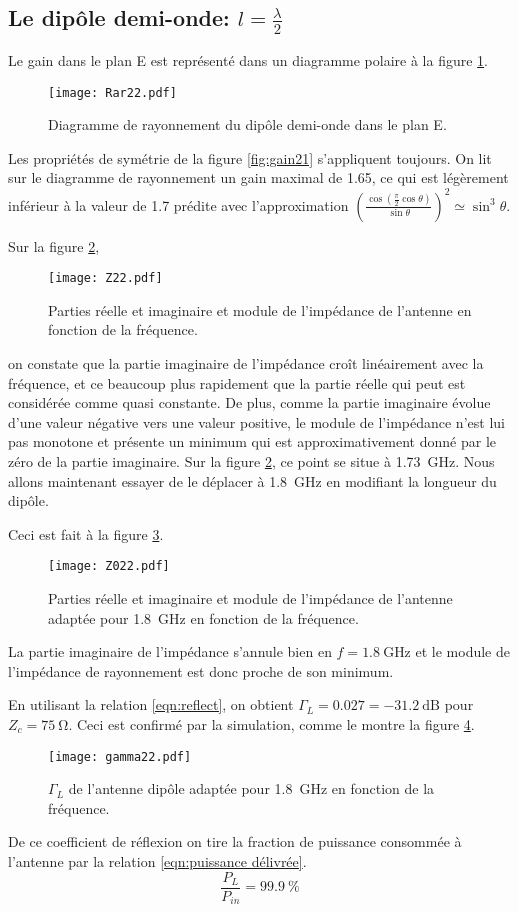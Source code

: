 \subsection{Le dipôle demi-onde: $l = \frac{\lambda}{2}$}
\label{subsec:demionde}
Le gain dans le plan E est représenté dans un diagramme polaire à la figure \ref{fig:gain22}.
\begin{figure}[htbp]
  \centering
  \texttt{[image: Rar22.pdf]}
  \caption{Diagramme de rayonnement du dipôle demi-onde dans le plan E.\label{fig:gain22}}
\end{figure}
Les propriétés de symétrie de la figure \ref{fig:gain21} s'appliquent toujours. On lit sur le diagramme de rayonnement un gain maximal de \num{1.65}, ce qui est légèrement inférieur à la valeur de \num{1.7} prédite avec l'approximation $\left ( \frac{\cos(\frac{\pi}{2}\cos\theta)}{\sin\theta} \right ) ^2 \simeq \sin^3 \theta$.

Sur la figure \ref{fig:Z22},
\begin{figure}[htbp]
  \centering
  \texttt{[image: Z22.pdf]}
  \caption{Parties réelle et imaginaire et module de l'impédance de l'antenne en fonction de la fréquence.\label{fig:Z22}}
\end{figure}
on constate que la partie imaginaire de l'impédance croît linéairement avec la fréquence, et ce beaucoup plus rapidement que la partie réelle qui peut est considérée comme quasi constante. De plus, comme la partie imaginaire évolue d'une valeur négative vers une valeur positive, le module de l'impédance n'est lui pas monotone et présente un minimum qui est approximativement donné par le zéro de la partie imaginaire. Sur la figure \ref{fig:Z22}, ce point se situe à \SI{1.73}{\giga\hertz}. Nous allons maintenant essayer de le déplacer à \SI{1.8}{\giga\hertz} en modifiant la longueur du dipôle.

Ceci est fait à la figure \ref{fig:Z022}.
\begin{figure}[htbp]
  \centering
  \texttt{[image: Z022.pdf]}
  \caption{Parties réelle et imaginaire et module de l'impédance de l'antenne adaptée pour \SI{1.8}{\giga\hertz} en fonction de la fréquence.\label{fig:Z022}}
\end{figure}
La partie imaginaire de l'impédance s'annule bien en $f = \SI{1.8}{\giga\hertz}$ et le module de l'impédance de rayonnement est donc proche de son minimum.

En utilisant la relation \ref{eqn:reflect}, on obtient $\Gamma_L = 0.027 = \SI{-31.2}{\deci\bel}$ pour $Z_c = \SI{75}{\ohm}$. Ceci est confirmé par la simulation, comme le montre la figure \ref{fig:gamma22}.
\begin{figure}[htbp]
  \centering
  \texttt{[image: gamma22.pdf]}
  \caption{$\Gamma_L$ de l'antenne dipôle adaptée pour \SI{1.8}{\giga\hertz} en fonction de la fréquence.\label{fig:gamma22}}
\end{figure}
De ce coefficient de réflexion on tire la fraction de puissance consommée à l'antenne par la relation \ref{eqn:puissance délivrée}.
\[
  \frac{P_L}{P_{in}} = \SI{99.9}{\percent}
\]

